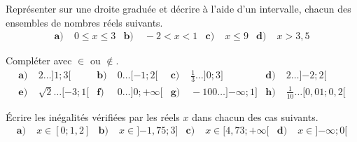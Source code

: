 \documentclass[11pt]{article}
\begin{document}
\begin{exo}
  Représenter sur une droite graduée et décrire à l'aide d'un intervalle, chacun
  des ensembles de nombres réels suivants.
  \begin{align*}
  \textbf{a)}&\; 0 \leq x \leq 3 &
  \textbf{b)}&\; -2 < x < 1 &
  \textbf{c)}&\; x \leq 9 &
  \textbf{d)}&\; x > 3,5
  \end{align*}
\end{exo}

\begin{exo}
  Compléter avec $\in$ ou $\notin$.
  \begin{align*}
  \textbf{a)}&\; 2 \ldots ]1; 3[ &
  \textbf{b)}&\; 0 \ldots [-1; 2[ &
  \textbf{c)}&\; \frac{1}{3} \ldots ]0; 3] &
  \textbf{d)}&\; 2 \ldots ]{-2}; 2[\\
  \textbf{e)}&\; \sqrt2 \ldots [-3; 1[ &
  \textbf{f)}&\; 0 \ldots ]0; +\infty[ &
  \textbf{g)}&\; -100 \ldots ]{-\infty}; 1] &
  \textbf{h)}&\; \frac{1}{10} \ldots [{0,01}; 0,2[
  \end{align*}
\end{exo}

\begin{exo}
  Écrire les inégalités vérifiées par les réels $x$ dans chacun des cas
  suivants.
  \begin{align*}
    \textbf{a)}&\; x\in[0; 1,2] &
    \textbf{b)}&\; x\in]{-1,75}; 3] &
    \textbf{c)}&\; x\in[4,73; +\infty[ &
    \textbf{d)}&\; x\in]{-\infty}; 0[
  \end{align*}
\end{exo}
\end{document}
